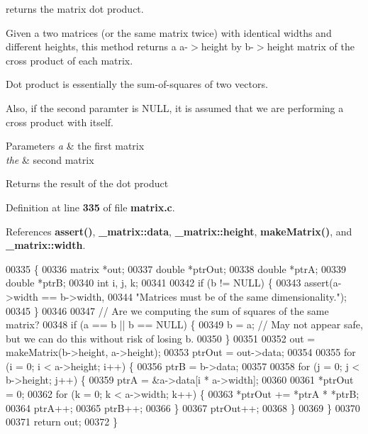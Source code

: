 returns the matrix dot product. 

Given a two matrices (or the same matrix twice) with identical widths and different heights, this method returns a a-\/$>$height by b-\/$>$height matrix of the cross product of each matrix.

Dot product is essentially the sum-\/of-\/squares of two vectors.

Also, if the second paramter is N\+U\+LL, it is assumed that we are performing a cross product with itself. 
\begin{DoxyParams}{Parameters}
{\em a} & the first matrix \\
\hline
{\em the} & second matrix \\
\hline
\end{DoxyParams}
\begin{DoxyReturn}{Returns}
the result of the dot product 
\end{DoxyReturn}


Definition at line \textbf{ 335} of file \textbf{ matrix.\+c}.



References \textbf{ assert()}, \textbf{ \+\_\+matrix\+::data}, \textbf{ \+\_\+matrix\+::height}, \textbf{ make\+Matrix()}, and \textbf{ \+\_\+matrix\+::width}.


\begin{DoxyCode}
00335                                                \{
00336   matrix *out;
00337   \textcolor{keywordtype}{double} *ptrOut;
00338   \textcolor{keywordtype}{double} *ptrA;
00339   \textcolor{keywordtype}{double} *ptrB;
00340   \textcolor{keywordtype}{int} i, j, k;
00341 
00342   \textcolor{keywordflow}{if} (b != NULL) \{
00343     assert(a->width == b->width,
00344            \textcolor{stringliteral}{"Matrices must be of the same dimensionality."});
00345   \}
00346 
00347   \textcolor{comment}{// Are we computing the sum of squares of the same matrix?}
00348   \textcolor{keywordflow}{if} (a == b || b == NULL) \{
00349     b = a; \textcolor{comment}{// May not appear safe, but we can do this without risk of losing b.}
00350   \}
00351 
00352   out = makeMatrix(b->height, a->height);
00353   ptrOut = out->data;
00354 
00355   \textcolor{keywordflow}{for} (i = 0; i < a->height; i++) \{
00356     ptrB = b->data;
00357 
00358     \textcolor{keywordflow}{for} (j = 0; j < b->height; j++) \{
00359       ptrA = &a->data[i * a->width];
00360 
00361       *ptrOut = 0;
00362       \textcolor{keywordflow}{for} (k = 0; k < a->width; k++) \{
00363         *ptrOut += *ptrA * *ptrB;
00364         ptrA++;
00365         ptrB++;
00366       \}
00367       ptrOut++;
00368     \}
00369   \}
00370 
00371   \textcolor{keywordflow}{return} out;
00372 \}
\end{DoxyCode}
\mbox{\label{a00125_ae98365c910e9d688d2bdedec50d89a6b}} 
